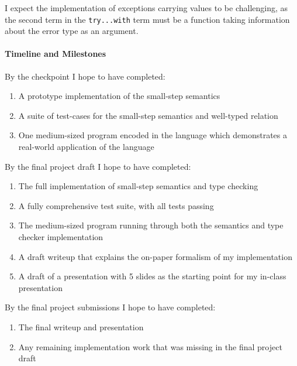 \documentclass{article}
\begin{document}
I expect the implementation of exceptions carrying values to be challenging, as the second term in the \texttt{try...with} term must be a function taking information about the error type as an argument.

\paragraph{Timeline and Milestones}

By the checkpoint I hope to have completed:
\begin{enumerate}
\item A prototype implementation of the small-step semantics
\item A suite of test-cases for the small-step semantics and well-typed relation
\item One medium-sized program encoded in the language which demonstrates a real-world application of the language
\end{enumerate}

\noindent
By the final project draft I hope to have completed:
\begin{enumerate}
\item The full implementation of small-step semantics and type checking
\item A fully comprehensive test suite, with all tests passing
\item The medium-sized program running through both the semantics and type checker implementation
\item A draft writeup that explains the on-paper formalism of my implementation
\item A draft of a presentation with 5 slides as the starting point for my in-class presentation
\end{enumerate}

\noindent
By the final project submissions I hope to have completed:
\begin{enumerate}
\item The final writeup and presentation
\item Any remaining implementation work that was missing in the final project draft
\end{enumerate}
\end{document}
